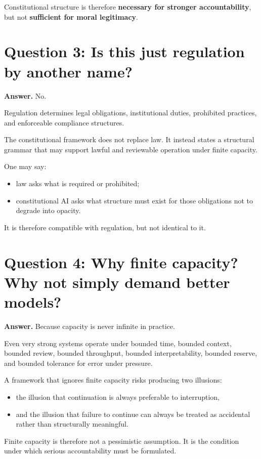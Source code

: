 \documentclass[11pt]{article}
\begin{document}
Constitutional structure is therefore \textbf{necessary for stronger accountability}, but not \textbf{sufficient for moral legitimacy}.

\section{Question 3: Is this just regulation by another name?}

\textbf{Answer.} No.

Regulation determines legal obligations, institutional duties, prohibited practices, and enforceable compliance structures.

The constitutional framework does not replace law. It instead states a structural grammar that may support lawful and reviewable operation under finite capacity.

One may say:
\begin{itemize}[leftmargin=2em]
    \item law asks what is required or prohibited;
    \item constitutional AI asks what structure must exist for those obligations not to degrade into opacity.
\end{itemize}

It is therefore compatible with regulation, but not identical to it.

\section{Question 4: Why finite capacity? Why not simply demand better models?}

\textbf{Answer.} Because capacity is never infinite in practice.

Even very strong systems operate under bounded time, bounded context, bounded review, bounded throughput, bounded interpretability, bounded reserve, and bounded tolerance for error under pressure.

A framework that ignores finite capacity risks producing two illusions:
\begin{itemize}[leftmargin=2em]
    \item the illusion that continuation is always preferable to interruption,
    \item and the illusion that failure to continue can always be treated as accidental rather than structurally meaningful.
\end{itemize}

Finite capacity is therefore not a pessimistic assumption. It is the condition under which serious accountability must be formulated.
\end{document}
